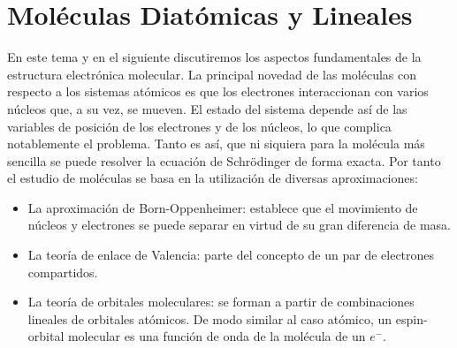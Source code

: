 \chapter{Moléculas Diatómicas y Lineales}
En este tema y en el siguiente discutiremos los aspectos 
fundamentales de la estructura electrónica molecular. 
La principal novedad de las moléculas con respecto a 
los sistemas atómicos es que los electrones 
interaccionan con varios núcleos que, a su vez, 
se mueven. El estado del sistema depende así de las
variables de posición de los electrones y de los 
núcleos, lo que complica notablemente el problema. 
Tanto es así, que ni siquiera para la molécula más sencilla se puede resolver la ecuación de Schrödinger
de forma exacta. Por tanto el estudio de moléculas se
basa en la utilización de diversas aproximaciones:
\begin{itemize}
\item La aproximación de Born-Oppenheimer: establece
que el movimiento de núcleos y electrones se puede
separar en virtud de su gran diferencia de masa.
\item La teoría de enlace de Valencia: parte del 
concepto de un par de electrones compartidos.
\item La teoría de orbitales moleculares: se forman
a partir de combinaciones lineales de orbitales atómicos. De modo similar al caso atómico, un espin-orbital molecular es una función de onda de la molécula de un $e^{-}$.
\end{itemize}

